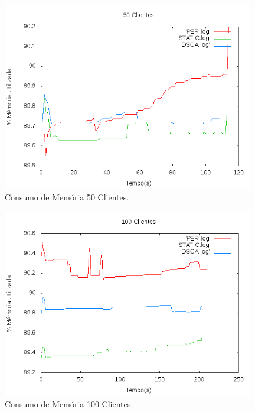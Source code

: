 \begin{figure}[htp]
\centering
\includegraphics[width=11cm]{chapters/chapter4/mem-50.png}
\caption[Consumo de Memória 50 Clientes]{Consumo de Memória 50 Clientes.}
\end{figure}

\begin{figure}[htp]
\centering
\includegraphics[width=11cm]{chapters/chapter4/mem-100.png}
\caption[Consumo de Memória 100 Clientes]{Consumo de Memória 100 Clientes.}
\end{figure}

